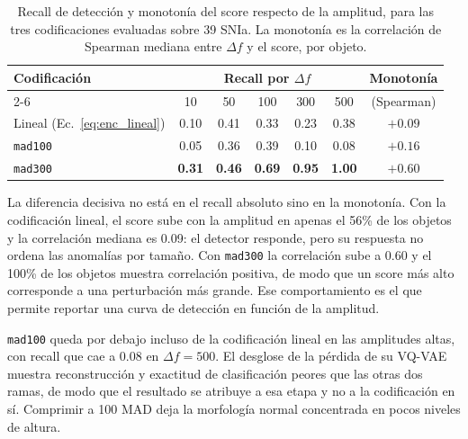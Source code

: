 \begin{table}[H]
\centering
\begin{tabular}{|l|c|c|c|c|c|c|}
\hline
\textbf{Codificación} & \multicolumn{5}{c|}{\textbf{Recall por} $\Delta f$} & \textbf{Monotonía} \\
\cline{2-6}
 & 10 & 50 & 100 & 300 & 500 & (Spearman) \\
\hline
Lineal (Ec.~\ref{eq:enc_lineal}) & 0.10 & 0.41 & 0.33 & 0.23 & 0.38 & $+0.09$ \\
\texttt{mad100}                  & 0.05 & 0.36 & 0.39 & 0.10 & 0.08 & $+0.16$ \\
\texttt{mad300}                  & \textbf{0.31} & \textbf{0.46} & \textbf{0.69} & \textbf{0.95} & \textbf{1.00} & $\mathbf{+0.60}$ \\
\hline
\end{tabular}
\caption{Recall de detección y monotonía del score respecto de la amplitud, para las tres codificaciones evaluadas sobre 39 SNIa. La monotonía es la correlación de Spearman mediana entre $\Delta f$ y el score, por objeto.}
\label{tab:codificaciones}
\end{table}

\begin{figure}[H]
\centering
{}
\end{figure}

La diferencia decisiva no está en el recall absoluto sino en la monotonía. Con la codificación lineal, el score sube con la amplitud en apenas el 56\% de los objetos y la correlación mediana es 0.09: el detector responde, pero su respuesta no ordena las anomalías por tamaño. Con \texttt{mad300} la correlación sube a 0.60 y el 100\% de los objetos muestra correlación positiva, de modo que un score más alto corresponde a una perturbación más grande. Ese comportamiento es el que permite reportar una curva de detección en función de la amplitud.

\texttt{mad100} queda por debajo incluso de la codificación lineal en las amplitudes altas, con recall que cae a 0.08 en $\Delta f = 500$. El desglose de la pérdida de su VQ-VAE muestra reconstrucción y exactitud de clasificación peores que las otras dos ramas, de modo que el resultado se atribuye a esa etapa y no a la codificación en sí. Comprimir a 100 MAD deja la morfología normal concentrada en pocos niveles de altura.

